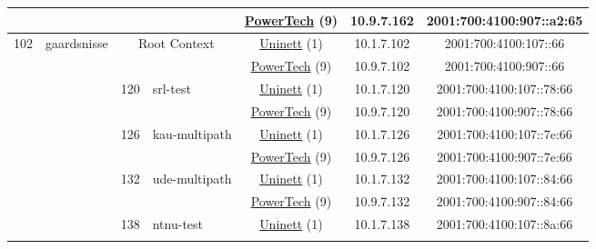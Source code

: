 \begin{small}
\begin{center}
\begin{longtable}{|c|c|c|c|c|c|c|c|}
  &  &  &  & \multicolumn{2}{|c|}{\tiny{\href{http://www.powertech.no}{PowerTech} (9)}} & \tiny{10.9.7.162} & \tiny{2001:700:4100:907::a2:65} \\ \hline
 \multirow{24}{*}{\tiny{102}} & \multicolumn{1}{|l|}{\multirow{24}{*}{\tiny{gaardsnisse}}} & \multicolumn{2}{|c|}{\multirow{2}{*}{\tiny{Root Context}}} & \multicolumn{2}{|c|}{\tiny{\href{https://www.uninett.no}{Uninett} (1)}} & \tiny{10.1.7.102} & \tiny{2001:700:4100:107::66} \\* \cline{5-5}\cline{6-6}\cline{7-7}\cline{8-8}
  &  & \multicolumn{2}{|c|}{} & \multicolumn{2}{|c|}{\tiny{\href{http://www.powertech.no}{PowerTech} (9)}} & \tiny{10.9.7.102} & \tiny{2001:700:4100:907::66} \\* \cline{3-3}\cline{4-4}\cline{5-5}\cline{6-6}\cline{7-7}\cline{8-8}
  &  & \multirow{2}{*}{\tiny{120}} & \multicolumn{1}{|l|}{\multirow{2}{*}{\tiny{srl-test}}} & \multicolumn{2}{|c|}{\tiny{\href{https://www.uninett.no}{Uninett} (1)}} & \tiny{10.1.7.120} & \tiny{2001:700:4100:107::78:66} \\* \cline{5-5}\cline{6-6}\cline{7-7}\cline{8-8}
  &  &  &  & \multicolumn{2}{|c|}{\tiny{\href{http://www.powertech.no}{PowerTech} (9)}} & \tiny{10.9.7.120} & \tiny{2001:700:4100:907::78:66} \\* \cline{3-3}\cline{4-4}\cline{5-5}\cline{6-6}\cline{7-7}\cline{8-8}
  &  & \multirow{2}{*}{\tiny{126}} & \multicolumn{1}{|l|}{\multirow{2}{*}{\tiny{kau-multipath}}} & \multicolumn{2}{|c|}{\tiny{\href{https://www.uninett.no}{Uninett} (1)}} & \tiny{10.1.7.126} & \tiny{2001:700:4100:107::7e:66} \\* \cline{5-5}\cline{6-6}\cline{7-7}\cline{8-8}
  &  &  &  & \multicolumn{2}{|c|}{\tiny{\href{http://www.powertech.no}{PowerTech} (9)}} & \tiny{10.9.7.126} & \tiny{2001:700:4100:907::7e:66} \\* \cline{3-3}\cline{4-4}\cline{5-5}\cline{6-6}\cline{7-7}\cline{8-8}
  &  & \multirow{2}{*}{\tiny{132}} & \multicolumn{1}{|l|}{\multirow{2}{*}{\tiny{ude-multipath}}} & \multicolumn{2}{|c|}{\tiny{\href{https://www.uninett.no}{Uninett} (1)}} & \tiny{10.1.7.132} & \tiny{2001:700:4100:107::84:66} \\* \cline{5-5}\cline{6-6}\cline{7-7}\cline{8-8}
  &  &  &  & \multicolumn{2}{|c|}{\tiny{\href{http://www.powertech.no}{PowerTech} (9)}} & \tiny{10.9.7.132} & \tiny{2001:700:4100:907::84:66} \\* \cline{3-3}\cline{4-4}\cline{5-5}\cline{6-6}\cline{7-7}\cline{8-8}
  &  & \multirow{2}{*}{\tiny{138}} & \multicolumn{1}{|l|}{\multirow{2}{*}{\tiny{ntnu-test}}} & \multicolumn{2}{|c|}{\tiny{\href{https://www.uninett.no}{Uninett} (1)}} & \tiny{10.1.7.138} & \tiny{2001:700:4100:107::8a:66} \\* \cline{5-5}\cline{6-6}\cline{7-7}\cline{8-8}

\end{longtable}
\end{center}
\end{small}
